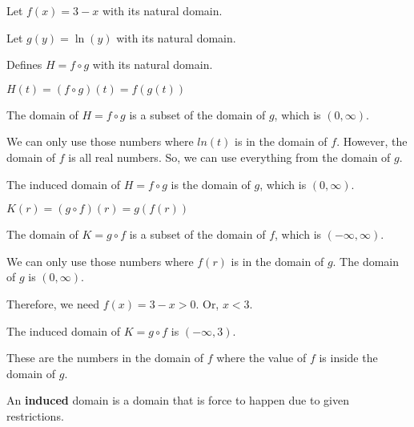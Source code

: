 \documentclass{ximera}
\begin{document}
\begin{example}


Let $f(x) = 3 - x$ with its natural domain.


Let $g(y) = \ln(y)$ with its natural domain.


Defines $H = f \circ g$ with its natural domain.



\begin{explanation}


$H(t) = (f \circ g)(t) = f(g(t))$


The domain of $H = f \circ g$ is a subset of the domain of $g$, which is $(0, \infty)$.  

We can only use those numbers where $ln(t)$ is in the domain of $f$.  However, the domain of $f$ is all real numbers.  So, we can use everything from the domain of $g$.

The induced domain of $H = f \circ g$ is the domain of $g$, which is $(0, \infty)$. 




\end{explanation}







\begin{explanation}


$K(r) = (g \circ f)(r) = g(f(r))$


The domain of $K = g \circ f$ is a subset of the domain of $f$, which is $(-\infty, \infty)$.  

We can only use those numbers where $f(r)$ is in the domain of $g$.  The domain of $g$ is $(0, \infty)$.  

Therefore, we need $f(x) = 3 - x > 0$.  Or, $x < 3$.

The induced domain of $K = g \circ f$ is $(-\infty, 3)$. 

These are the numbers in the domain of $f$ where the value of $f$ is inside the domain of $g$.


\end{explanation}




\end{example}


An \textbf{induced} domain is a domain that is force to happen due to given restrictions. \\
\end{document}
